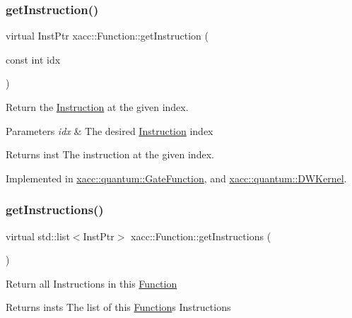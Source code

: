 \subsubsection{\texorpdfstring{get\+Instruction()}{getInstruction()}}
{\footnotesize\ttfamily virtual Inst\+Ptr xacc\+::\+Function\+::get\+Instruction (\begin{DoxyParamCaption}\item[{const int}]{idx }\end{DoxyParamCaption})\hspace{0.3cm}{\ttfamily [pure virtual]}}

Return the \hyperlink{a01155}{Instruction} at the given index.


\begin{DoxyParams}{Parameters}
{\em idx} & The desired \hyperlink{a01155}{Instruction} index \\
\hline
\end{DoxyParams}
\begin{DoxyReturn}{Returns}
inst The instruction at the given index. 
\end{DoxyReturn}


Implemented in \hyperlink{a01011_a841d656eed8aa9b4c0eec3f1da38069c}{xacc\+::quantum\+::\+Gate\+Function}, and \hyperlink{a00983_a00f23cd2e15ea6b9d00d4f3dbe1540f8}{xacc\+::quantum\+::\+D\+W\+Kernel}.

\mbox{\label{a01151_aaf80bd3d49113a92b520785572663032}} 
\subsubsection{\texorpdfstring{get\+Instructions()}{getInstructions()}}
{\footnotesize\ttfamily virtual std\+::list$<$Inst\+Ptr$>$ xacc\+::\+Function\+::get\+Instructions (\begin{DoxyParamCaption}{ }\end{DoxyParamCaption})\hspace{0.3cm}{\ttfamily [pure virtual]}}

Return all Instructions in this \hyperlink{a01151}{Function}

\begin{DoxyReturn}{Returns}
insts The list of this \hyperlink{a01151}{Function}\textquotesingle{}s Instructions 
\end{DoxyReturn}


